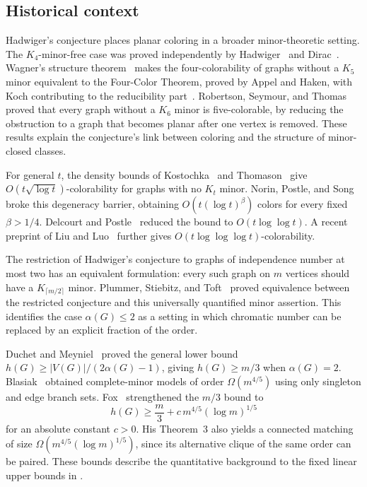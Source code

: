 \subsection{Historical context}

Hadwiger's conjecture places planar coloring in a broader minor-theoretic
setting. The \(K_4\)-minor-free case was proved independently by
Hadwiger~\citep{hadwiger1943} and Dirac~\citep{Dirac1952}.
Wagner's structure theorem~\citep{Wagner1937} makes the
four-colorability of graphs without a \(K_5\) minor equivalent to the
Four-Color Theorem, proved by Appel and Haken, with Koch contributing
to the reducibility part~\citep{AppelHaken1977,AppelHakenKoch1977}.
Robertson, Seymour, and Thomas~\citep{RobertsonSeymourThomas1993}
proved that every graph without a \(K_6\) minor is five-colorable,
by reducing the obstruction to a graph that becomes planar after
one vertex is removed. These results explain the conjecture's link
between coloring and the structure of minor-closed classes.

For general \(t\), the density bounds of
Kostochka~\citep{Kostochka1984} and Thomason~\citep{Thomason1984}
give \(O(t\sqrt{\log t})\)-colorability for graphs with no \(K_t\)
minor. Norin, Postle, and Song~\citep[Theorem~1.4]{NorinPostleSong2023}
broke this degeneracy barrier, obtaining
\(O(t(\log t)^\beta)\) colors for every fixed \(\beta>1/4\).
Delcourt and Postle~\citep[Theorem~1.5]{DelcourtPostle2025} reduced the
bound to \(O(t\log\log t)\). A recent preprint of Liu and
Luo~\citep[Theorem~1.1]{LiuLuo2026} further gives
\(O(t\log\log\log t)\)-colorability.

The restriction of Hadwiger's conjecture to graphs of independence
number at most two has an equivalent formulation: every such
graph on \(m\) vertices should have a
\(K_{\lceil m/2\rceil}\) minor. Plummer, Stiebitz, and
Toft~\citep[Theorem~3.1]{pst2003} proved equivalence between the
restricted conjecture and this universally quantified minor assertion.
This identifies the case
\(\alpha(G)\le2\) as a setting in which chromatic number can be replaced by an
explicit fraction of the order.

Duchet and Meyniel~\citep{duchet1982} proved the general lower bound
\(h(G)\ge |V(G)|/(2\alpha(G)-1)\), giving \(h(G)\ge m/3\)
when \(\alpha(G)=2\). Blasiak~\citep{Blasiak2007} obtained complete-minor models of order
\(\Omega(m^{4/5})\) using only singleton and edge branch sets.
Fox~\citep[Theorem~2]{fox2010} strengthened the \(m/3\) bound to
\[
             h(G)\ge \frac m3+c\,m^{4/5}(\log m)^{1/5}
\]
for an absolute constant \(c>0\). His Theorem~3 also yields a
connected matching of size \(\Omega(m^{4/5}(\log m)^{1/5})\), since
its alternative clique of the same order can be paired. These bounds
describe the quantitative background
to the fixed linear upper bounds in .

